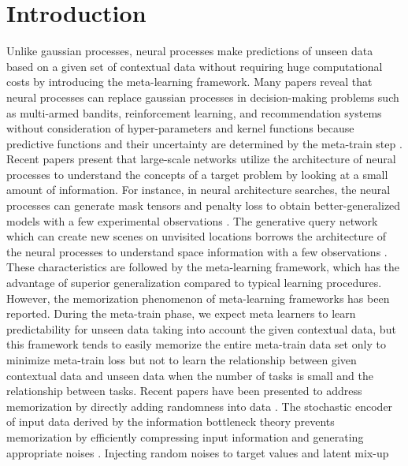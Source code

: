 \section{Introduction}
Unlike gaussian processes, neural processes make predictions of unseen data
based on a given set of contextual data without requiring huge computational
costs by introducing the meta-learning framework\cite{garnelo2018conditional,
garnelo2018neural, kim2019attentive}. Many papers reveal that neural processes
can replace gaussian processes in decision-making problems such as multi-armed
bandits, reinforcement learning, and recommendation systems without
consideration of hyper-parameters and kernel functions because predictive
functions and their uncertainty are determined by the meta-train step
\cite{garnelo2018neural, galashov2019meta, wei2019transferable,
korshunova2020conditional}. Recent papers present that large-scale networks
utilize the architecture of neural processes to understand the concepts of a
target problem by looking at a small amount of information. For instance, in
neural architecture searches, the neural processes can generate mask tensors and
penalty loss to obtain better-generalized models with a few experimental
observations \cite{NEURIPS2020_84ddfb34, lee2020neural, yoon2020robustifying}.
The generative query network which can create new scenes on unvisited locations
borrows the architecture of the neural processes to understand space information
with a few observations \cite{eslami2018neural, Singh2019Sequential,
yoon2020robustifying}. These characteristics are followed by the meta-learning
framework, which has the advantage of superior generalization compared to
typical learning procedures. However, the memorization phenomenon of
meta-learning frameworks has been reported. During the meta-train phase, we
expect meta learners to learn predictability for unseen data taking into account
the given contextual data, but this framework tends to easily memorize the
entire meta-train data set only to minimize meta-train loss but not to learn the
relationship between given contextual data and unseen data when the number of
tasks is small and the relationship between tasks. Recent papers have been
presented to address memorization by directly adding randomness into data
\citep{yin2019meta, Rajendran2020meta, yao2020improving}. The stochastic encoder
of input data derived by the information bottleneck theory prevents memorization
by efficiently compressing input information and generating appropriate noises
\cite{yin2019meta}. Injecting random noises to target values and latent mix-up
